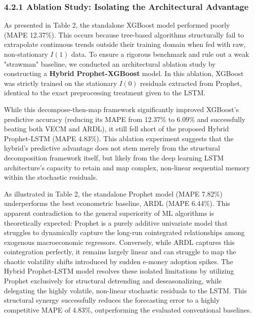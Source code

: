 \documentclass[12pt, letterpaper]{article}
\begin{document}
\subsubsection*{4.2.1 Ablation Study: Isolating the Architectural Advantage}
As presented in Table 2, the standalone XGBoost model performed poorly (MAPE 12.37\%). This occurs because tree-based algorithms structurally fail to extrapolate continuous trends outside their training domain when fed with raw, non-stationary $I(1)$ data. To ensure a rigorous benchmark and rule out a weak "strawman" baseline, we conducted an architectural ablation study by constructing a \textbf{Hybrid Prophet-XGBoost} model. In this ablation, XGBoost was strictly trained on the stationary $I(0)$ residuals extracted from Prophet, identical to the exact preprocessing treatment given to the LSTM. 

While this decompose-then-map framework significantly improved XGBoost's predictive accuracy (reducing its MAPE from 12.37\% to 6.09\% and successfully beating both VECM and ARDL), it still fell short of the proposed Hybrid Prophet-LSTM (MAPE 4.83\%). This ablation experiment suggests that the hybrid's predictive advantage does not stem merely from the structural decomposition framework itself, but likely from the deep learning LSTM architecture's capacity to retain and map complex, non-linear sequential memory within the stochastic residuals.

As illustrated in Table 2, the standalone Prophet model (MAPE 7.82\%) underperforms the best econometric baseline, ARDL (MAPE 6.44\%). This apparent contradiction to the general superiority of ML algorithms is theoretically expected: Prophet is a purely additive univariate model that struggles to dynamically capture the long-run cointegrated relationships among exogenous macroeconomic regressors. Conversely, while ARDL captures this cointegration perfectly, it remains largely linear and can struggle to map the chaotic volatility shifts introduced by sudden e-money adoption spikes. The Hybrid Prophet-LSTM model resolves these isolated limitations by utilizing Prophet exclusively for structural detrending and deseasonalizing, while delegating the highly volatile, non-linear stochastic residuals to the LSTM. This structural synergy successfully reduces the forecasting error to a highly competitive MAPE of 4.83\%, outperforming the evaluated conventional baselines.
\end{document}
